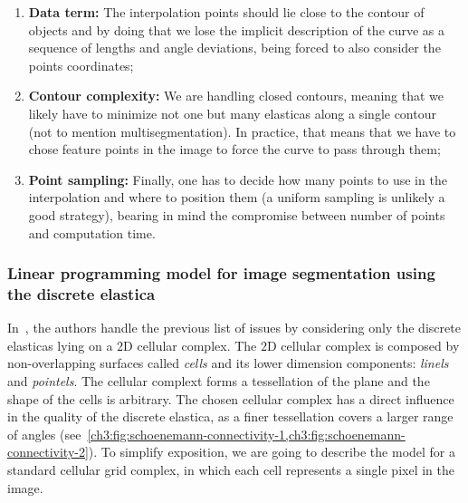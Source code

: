 \begin{enumerate}
	\item{\textbf{Data term:} The interpolation points should lie close to the contour of objects and by doing that we lose the implicit description of the curve as a sequence of lengths and angle deviations, being forced to also consider the points coordinates;}
	\item{\textbf{Contour complexity:} We are handling closed contours, meaning that we likely have to minimize not one but many elasticas along a single contour (not to mention multisegmentation). In practice, that means that we have to chose feature points in the image to force the curve to pass through them;}
	\item{\textbf{Point sampling:} Finally, one has to decide how many points to use in the interpolation and where to position them (a uniform sampling is unlikely a good strategy), bearing in mind the compromise between number of points and computation time.}
\end{enumerate}




\subsubsection{Linear programming model for image segmentation using the discrete elastica}

In~\cite{schoenemann09linear}, the authors handle the previous list of issues by considering only the discrete elasticas lying on a $2$D cellular complex. The $2$D cellular complex is composed by non-overlapping surfaces called \emph{cells} and its lower dimension components: \emph{linels} and \emph{pointels}. The cellular complext forms a tessellation of the plane and the shape of the cells is arbitrary. The chosen cellular complex has a direct influence in the quality of the discrete elastica, as a finer tessellation covers a larger range of angles (see~\cref{ch3:fig:schoenemann-connectivity-1,ch3:fig:schoenemann-connectivity-2}). To simplify exposition, we are going to describe the model for a standard cellular grid complex, in which each cell represents a single pixel in the image.

